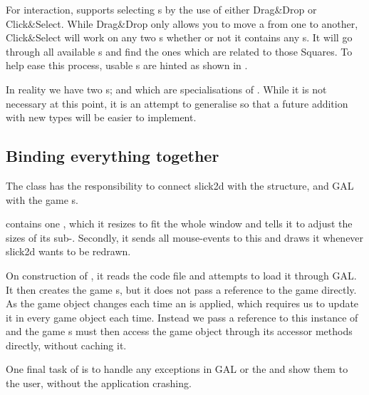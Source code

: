 For interaction,  supports selecting s by
the use of either Drag\&Drop or Click\&Select. While Drag\&Drop only allows
you to move a  from one  to another, Click\&Select 
will work on any two s whether or not it contains any
s. It will go through all available s and find
the ones which are related to those Squares. To help ease this process, usable
s are hinted as shown in .

In reality we have two s;  and
 which are specialisations of .
While it is not necessary at this point, it is an attempt to generalise
 so that a future addition with new  types
will be easier to implement.

\subsection{Binding everything together}
\label{sec:connection}

The class  has the responsibility to connect slick2d
with the  structure, and GAL with the game s.

 contains one , which it resizes
to fit the whole window and tells it to adjust the sizes of its
sub-. Secondly, it sends all mouse-events to this
 and draws it whenever slick2d wants to be redrawn.

On construction of , it reads the \productname code file
and attempts to load it through GAL. It then creates the game
s, but it does not pass a reference to the game directly. As
the game object changes each time an  is applied, which
requires us to update it in every game object each time. Instead we pass a
reference to this instance of  and the game
s must
then access the game object through its accessor methods directly, without
caching it.

One final task of  is to handle any exceptions in GAL or
the  and show them to the user, without the application
crashing.
